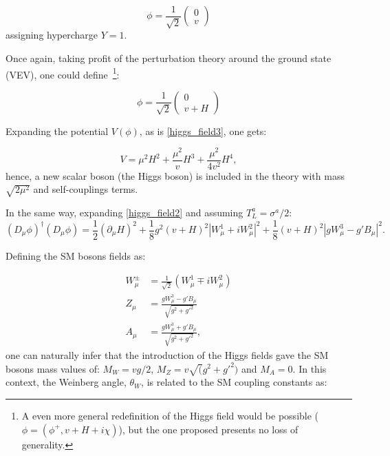 \begin{equation}
    \phi = \frac{1}{\sqrt{2}}
        \left ( 
        \begin{matrix}
        0 \\
        v 
        \end{matrix}
        \right )
    \label{higgs_field_vev_based}
\end{equation}
assigning hypercharge $Y=1$.

Once again, taking profit of the perturbation theory around the ground state (VEV), one could define~\footnote{A even more general redefinition of the Higgs field would be possible ($\phi = (\phi^+, v + H +i \chi)$), but the one proposed presents no loss of generality.}:

\begin{equation}
    \phi = \frac{1}{\sqrt{2}}
        \left ( 
        \begin{matrix}
        0 \\
        v + H
        \end{matrix}
        \right )
    \label{higgs_field_vev_based}
\end{equation}

Expanding the potential $V(\phi)$, as is \ref{higgs_field3}, one gets:

\begin{equation}
    V = \mu^2 H^2 + \frac{\mu^2}{v} H^3 + \frac{\mu^2}{4v^2} H^4,
    \label{higgs_mass_term}
\end{equation}
hence, a new scalar boson (the Higgs boson) is included in the theory with mass $\sqrt{2\mu^2}$ and self-couplings terms.

In the same way, expanding \ref{higgs_field2} and assuming $T_L^a = \sigma^a/2$: 
\begin{equation}
    (D_\mu\phi)^\dagger(D_\mu\phi) = \frac{1}{2}(\partial_\mu H)^2 + \frac{1}{8}g^2(v+H)^2|W_\mu^1+iW_\mu^2|^2 + \frac{1}{8}(v+H)^2|gW_\mu^3-g'B_\mu|^2.
    \label{higgs_mass_term}
\end{equation}

Defining the SM bosons fields as:

\begin{equation}
    \begin{split}
        W_\mu^\pm &= \frac{1}{\sqrt{2}} (W_\mu^1 \mp iW_\mu^2) \\ 
        Z_\mu &= \frac{gW_\mu^3-g'B_\mu}{\sqrt{g^2+g'^2}} \\ 
        A_\mu &= \frac{gW_\mu^3+g'B_\mu}{\sqrt{g^2+g'^2}},
    \end{split}
    \label{sm_bosons_fields}
\end{equation}
one can naturally infer that the introduction of the Higgs fields gave the SM bosons mass values of: $M_W = vg/2$, $M_Z = v\sqrt(g^2+g'^2)$ and $M_A = 0$. In this context, the Weinberg angle, $\theta_W$, is related to the SM coupling constants as:

